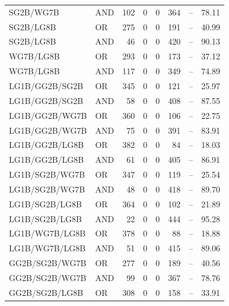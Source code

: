 \documentclass{article}
\begin{document}
{\begin{longtable}{llrrrrrr}
 SG2B/WG7B                & AND     &  102 &    0 &    0 &  364 & --    & 78.11             \\
 SG2B/LG8B                & OR      &  275 &    0 &    0 &  191 & --    & 40.99             \\
 SG2B/LG8B                & AND     &   46 &    0 &    0 &  420 & --    & 90.13             \\
 WG7B/LG8B                & OR      &  293 &    0 &    0 &  173 & --    & 37.12             \\
 WG7B/LG8B                & AND     &  117 &    0 &    0 &  349 & --    & 74.89             \\
 LG1B/GG2B/SG2B           & OR      &  345 &    0 &    0 &  121 & --    & 25.97             \\
 LG1B/GG2B/SG2B           & AND     &   58 &    0 &    0 &  408 & --    & 87.55             \\
 LG1B/GG2B/WG7B           & OR      &  360 &    0 &    0 &  106 & --    & 22.75             \\
 LG1B/GG2B/WG7B           & AND     &   75 &    0 &    0 &  391 & --    & 83.91             \\
 LG1B/GG2B/LG8B           & OR      &  382 &    0 &    0 &   84 & --    & 18.03             \\
 LG1B/GG2B/LG8B           & AND     &   61 &    0 &    0 &  405 & --    & 86.91             \\
 LG1B/SG2B/WG7B           & OR      &  347 &    0 &    0 &  119 & --    & 25.54             \\
 LG1B/SG2B/WG7B           & AND     &   48 &    0 &    0 &  418 & --    & 89.70             \\
 LG1B/SG2B/LG8B           & OR      &  364 &    0 &    0 &  102 & --    & 21.89             \\
 LG1B/SG2B/LG8B           & AND     &   22 &    0 &    0 &  444 & --    & 95.28             \\
 LG1B/WG7B/LG8B           & OR      &  378 &    0 &    0 &   88 & --    & 18.88             \\
 LG1B/WG7B/LG8B           & AND     &   51 &    0 &    0 &  415 & --    & 89.06             \\
 GG2B/SG2B/WG7B           & OR      &  277 &    0 &    0 &  189 & --    & 40.56             \\
 GG2B/SG2B/WG7B           & AND     &   99 &    0 &    0 &  367 & --    & 78.76             \\
 GG2B/SG2B/LG8B           & OR      &  308 &    0 &    0 &  158 & --    & 33.91             \\

\end{longtable}}
\end{document}
